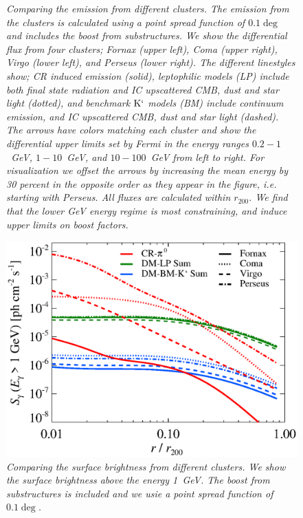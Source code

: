 \documentclass[10pt,aps,pra,reprint,amsmath,amsfonts,amssymb,showpacs]{revtex4-1}
\newcommand{\rmn}{\mathrm}
\newcommand{\rvir}{r_{200}}
\newcommand{\Km}{\rmn{K}`}
\begin{document}
\begin{figure}
\begin{minipage}{2.0\columnwidth}
\caption{\it Comparing the emission from different clusters. The
  emission from the clusters is calculated using a point spread
  function of $0.1\deg$ and includes the boost from substructures. We
  show the differential flux from four clusters; Fornax (upper left),
  Coma (upper right), Virgo (lower left), and Perseus (lower
  right). The different linestyles show; CR induced emission (solid),
  leptophilic models (LP) include both final state radiation and IC
  upscattered CMB, dust and star light (dotted), and benchmark $\Km$
  models (BM) include continuum emission, and IC upscattered CMB, dust
  and star light (dashed). The arrows have colors matching each
  cluster and show the differential upper limits set by Fermi in the
  energy ranges $0.2-1$~GeV, $1-10$~GeV, and $10-100$~GeV from left to
  right. For visualization we offset the arrows by increasing the mean
  energy by 30 percent in the opposite order as they appear in the
  figure, i.e. starting with Perseus. All fluxes are calculated within
  $\rvir$. We find that the lower GeV energy regime is most
  constraining, and induce upper limits on boost factors.}
 \label{fig9}
\end{minipage}
\end{figure}

\begin{figure}
 \includegraphics[width=0.99\columnwidth]{figures/SB.v8.1GeV.SF300.SubMass.elmu.eps}
\caption{\it Comparing the surface brightness from different
  clusters. We show the surface brightness above the energy 1~GeV. The
  boost from substructures is included and we usie a point spread
  function of $0.1\deg$.}
 \label{fig20}
\end{figure}
\end{document}
